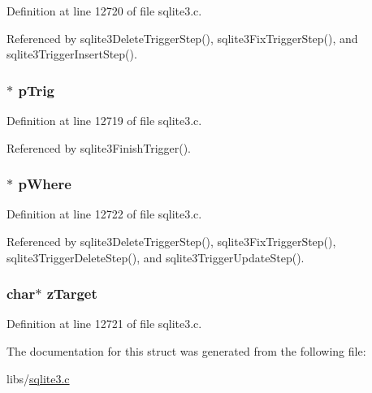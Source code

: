 Definition at line 12720 of file sqlite3.\+c.



Referenced by sqlite3\+Delete\+Trigger\+Step(), sqlite3\+Fix\+Trigger\+Step(), and sqlite3\+Trigger\+Insert\+Step().

\hypertarget{struct_trigger_step_aa795f89271dd5477d90d958829450199}{}
\subsubsection[{p\+Trig}]{$\ast$ p\+Trig}\label{struct_trigger_step_aa795f89271dd5477d90d958829450199}


Definition at line 12719 of file sqlite3.\+c.



Referenced by sqlite3\+Finish\+Trigger().

\hypertarget{struct_trigger_step_aa35a11dc7821bfaf357249ff3da68863}{}
\subsubsection[{p\+Where}]{$\ast$ p\+Where}\label{struct_trigger_step_aa35a11dc7821bfaf357249ff3da68863}


Definition at line 12722 of file sqlite3.\+c.



Referenced by sqlite3\+Delete\+Trigger\+Step(), sqlite3\+Fix\+Trigger\+Step(), sqlite3\+Trigger\+Delete\+Step(), and sqlite3\+Trigger\+Update\+Step().

\hypertarget{struct_trigger_step_a43612a4dd380649736cd8212f60f4e57}{}
\subsubsection[{z\+Target}]{\setlength{\rightskip}{0pt plus 5cm}char$\ast$ z\+Target}\label{struct_trigger_step_a43612a4dd380649736cd8212f60f4e57}


Definition at line 12721 of file sqlite3.\+c.



The documentation for this struct was generated from the following file\+:\begin{DoxyCompactItemize}
\item 
libs/\hyperlink{sqlite3_8c}{sqlite3.\+c}\end{DoxyCompactItemize}
